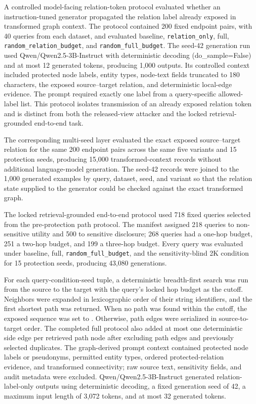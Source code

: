 \documentclass[preprint,12pt]{elsarticle}
\begin{document}
A controlled model-facing relation-token protocol evaluated whether an instruction-tuned generator propagated the relation label already exposed in transformed graph context. The protocol contained 200 fixed endpoint pairs, with 40 queries from each dataset, and evaluated baseline, \nolinkurl{relation_only}, full, \nolinkurl{random_relation_budget}, and \nolinkurl{random_full_budget}. The seed-42 generation run used Qwen/Qwen2.5-3B-Instruct with deterministic decoding (do\_sample=False) and at most 12 generated tokens, producing 1,000 outputs. Its controlled context included protected node labels, entity types, node-text fields truncated to 180 characters, the exposed source--target relation, and deterministic local-edge evidence. The prompt required exactly one label from a query-specific allowed-label list. This protocol isolates transmission of an already exposed relation token and is distinct from both the released-view attacker and the locked retrieval-grounded end-to-end task.

The corresponding multi-seed layer evaluated the exact exposed source--target relation for the same 200 endpoint pairs across the same five variants and 15 protection seeds, producing 15,000 transformed-context records without additional language-model generation. The seed-42 records were joined to the 1,000 generated examples by query, dataset, seed, and variant so that the relation state supplied to the generator could be checked against the exact transformed graph.

The locked retrieval-grounded end-to-end protocol used 718 fixed queries selected from the pre-protection path protocol. The manifest assigned 218 queries to non-sensitive utility and 500 to sensitive disclosure; 268 queries had a one-hop budget, 251 a two-hop budget, and 199 a three-hop budget. Every query was evaluated under baseline, full, \nolinkurl{random_full_budget}, and the sensitivity-blind 2K condition for 15 protection seeds, producing 43,080 generations.

For each query-condition-seed tuple, a deterministic breadth-first search was run from the source to the target with the query's locked hop budget as the cutoff. Neighbors were expanded in lexicographic order of their string identifiers, and the first shortest path was returned. When no path was found within the cutoff, the exposed sequence was set to . Otherwise, path edges were serialized in source-to-target order. The completed full protocol also added at most one deterministic side edge per retrieved path node after excluding path edges and previously selected duplicates. The graph-derived prompt context contained protected node labels or pseudonyms, permitted entity types, ordered protected-relation evidence, and transformed connectivity; raw source text, sensitivity fields, and audit metadata were excluded. Qwen/Qwen2.5-3B-Instruct generated relation-label-only outputs using deterministic decoding, a fixed generation seed of 42, a maximum input length of 3,072 tokens, and at most 32 generated tokens.
\end{document}
